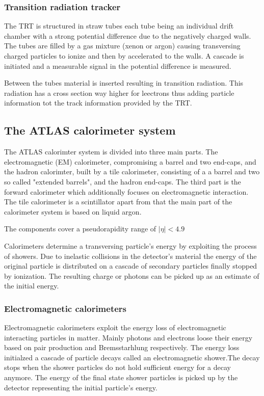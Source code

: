 \subsubsection{Transition radiation tracker}

The TRT is structured in straw tubes each tube being an individual drift chamber with a strong potential difference due to the negatively charged walls. The tubes are filled by a gas mixture (xenon or argon) causing transversing charged particles to ionize and then by accelerated to the walls. A cascade is initiated and a measurable signal in the potential difference is measured. 

Between the tubes material is inserted resulting in transition radiation. This radiation has a cross section way higher for leectrons thus adding particle information tot the track information provided by the TRT.

\subsection{The ATLAS calorimeter system}

The ATLAS calorimter system is divided into three main parts. The electromagnetic (EM) calorimeter, compromising a barrel and two end-caps, and the hadron calorimter, built by a tile calorimeter, consisting of a a barrel and two so called "extended barrels", and the hadron end-caps. The third part is the forward calorimeter which additionally focuses on electromagnetic interaction. The tile calorimeter is a scintillator apart from that the main part of the calorimeter system is based on liquid argon.

The components cover a pseudorapidity range of $|\eta| < 4.9$

Calorimeters determine a transversing particle's energy by exploiting the process of showers. Due to inelastic collisions in the detector's material the energy of the original particle is distributed on a cascade of secondary particles finally stopped by ionization. The resulting charge or photons can be picked up as an estimate of the initial energy.

\subsubsection{Electromagnetic calorimeters}

Electromagnetic calorimeters exploit the energy loss of electromagnetic interacting particles in matter. Mainly photons and electrons loose their energy based on pair production and Bremsstarhlung respectively. The energy loss initialzed a cascade of particle decays called an electromagnetic shower.The decay stops when the shower particles do not hold sufficient energy for a decay anymore. The energy of the final state shower particles is picked up by the detector representing the initial particle's energy.

